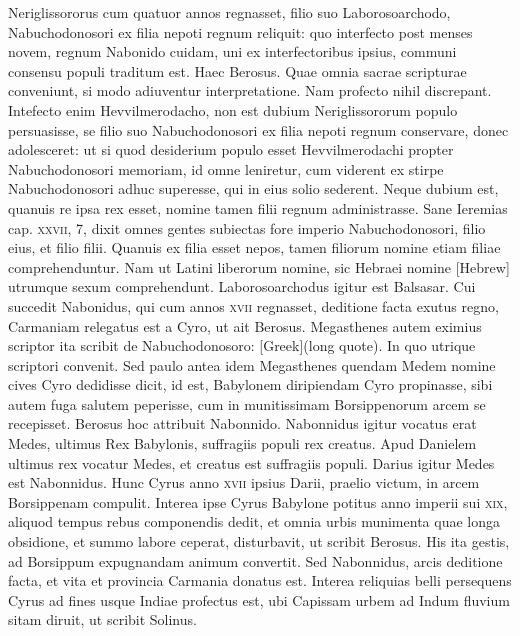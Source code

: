 Neriglissororus cum quatuor annos regnasset,
filio suo Laborosoarchodo, Nabuchodonosori ex filia nepoti
regnum reliquit: quo interfecto post menses novem, regnum Nabonido
cuidam, uni ex interfectoribus ipsius, communi consensu
populi traditum est.
Haec Berosus.
Quae omnia sacrae scripturae conveniunt,
si modo adiuventur interpretatione.
Nam profecto nihil
discrepant.
Intefecto enim Hevvilmerodacho, non est dubium
Neriglissororum populo persuasisse, se filio suo Nabuchodonosori
ex filia nepoti regnum conservare, donec adolesceret: ut si quod
desiderium populo esset Hevvilmerodachi propter Nabuchodonosori
memoriam, id omne leniretur, cum viderent ex stirpe Nabuchodonosori
adhuc superesse, qui in eius solio sederent.
Neque dubium est, quanuis re ipsa rex esset, nomine tamen filii regnum
administrasse.
Sane Ieremias cap. \textsc{xxvii}, 7, dixit omnes gentes subiectas
fore imperio Nabuchodonosori, filio eius, et filio filii.
Quanuis ex filia esset nepos, tamen filiorum nomine etiam filiae
 comprehenduntur.
Nam ut Latini liberorum nomine, sic Hebraei nomine
\texthebrew{[Hebrew]} utrumque sexum comprehendunt.
Laborosoarchodus igitur
est Balsasar.
Cui succedit Nabonidus, qui cum annos \textsc{xvii} regnasset,
deditione facta exutus regno, Carmaniam relegatus est a Cyro,
ut ait Berosus.
Megasthenes autem eximius scriptor ita scribit de
Nabuchodonosoro: \textgreek{[Greek](long quote)}.
In
quo utrique scriptori convenit.
Sed paulo antea idem Megasthenes
quendam Medem nomine cives Cyro dedidisse dicit, id est, Babylonem
diripiendam Cyro propinasse, sibi autem fuga salutem peperisse,
cum in munitissimam Borsippenorum arcem se recepisset.
Berosus hoc attribuit Nabonnido.
Nabonnidus igitur vocatus erat
Medes, ultimus Rex Babylonis, suffragiis populi rex creatus.
Apud
Danielem ultimus rex vocatur Medes, et creatus est suffragiis populi.
Darius igitur Medes est Nabonnidus.
Hunc Cyrus anno \textsc{xvii}
ipsius Darii, praelio victum, in arcem Borsippenam compulit.
Interea ipse Cyrus Babylone potitus anno imperii sui
 \textsc{xix}, aliquod
tempus rebus componendis dedit, et omnia urbis munimenta
quae longa obsidione, et summo labore ceperat, disturbavit, ut
scribit Berosus.
His ita gestis, ad Borsippum expugnandam animum
convertit.
Sed Nabonnidus, arcis deditione facta, et vita
et provincia Carmania donatus est.
Interea reliquias belli persequens
Cyrus ad fines usque Indiae profectus est, ubi Capissam urbem
ad Indum fluvium sitam diruit, ut scribit Solinus.

